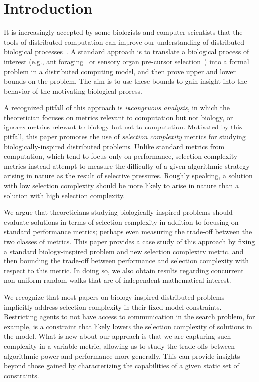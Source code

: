 \documentclass[11pt]{article}
\begin{document}
\pagebreak


\section{Introduction}
\label{sec:intro}


It is increasingly accepted by some biologists and computer scientists that the tools of distributed computation can improve our understanding of distributed biological processes~\cite{feinerman12disc, feinerman13, feinerman12podc}. A standard approach is to translate a biological process of interest (e.g., ant foraging~\cite{feinerman12disc, feinerman12podc} or sensory organ pre-cursor selection~\cite{afek11}) into a formal problem in a distributed computing model, and then prove upper and lower bounds on the problem. The aim is to use these bounds to gain insight into the behavior of the motivating biological process.

A recognized pitfall of this approach is \emph{incongruous analysis}, in which the theoretician focuses on metrics relevant to computation but not biology, or ignores metrics relevant to biology but not to computation.  Motivated by this pitfall, this paper promotes the use of {\em selection complexity} metrics for studying biologically-inspired distributed problems. Unlike standard metrics from computation, which tend to focus only on performance, selection complexity metrics instead attempt to measure the difficulty of a given algorithmic strategy arising in nature as the result of selective pressures. Roughly speaking, a solution with low selection complexity should be more likely to arise in nature than a solution with high selection complexity.

We argue that theoreticians studying biologically-inspired problems should evaluate solutions in terms of selection complexity in addition to focusing on standard performance metrics; perhaps even measuring the trade-off between the two classes of metrics. This paper provides a case study of this approach by fixing a standard biology-inspired problem and new selection complexity metric, and then bounding the trade-off between performance and selection complexity with respect to this metric. In doing so, we also obtain results regarding concurrent non-uniform random walks that are of independent mathematical interest.

We recognize that most papers on biology-inspired distributed problems implicitly address selection complexity in their fixed model constraints. Restricting agents to not have access to communication in the search problem, for example, is a constraint that likely lowers the selection complexity of solutions in the model. What is new about our approach is that we are capturing such complexity in a variable metric, allowing us to study the trade-offs between algorithmic power and performance more generally. This can provide insights beyond those gained by characterizing the capabilities of a given static set of constraints.
\end{document}
